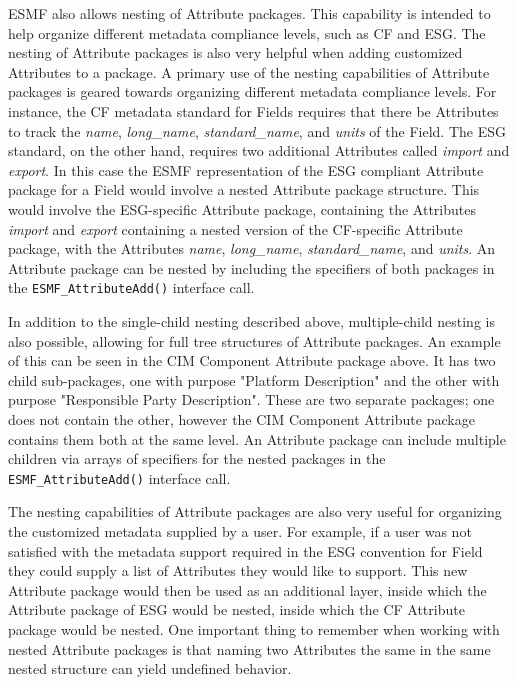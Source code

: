 \vspace{8pt}
ESMF also allows nesting of Attribute packages.  This capability is intended to help organize different metadata compliance levels, such as CF and ESG.  The nesting of Attribute packages is also very helpful when adding customized Attributes to a package.  A primary use of the nesting capabilities of Attribute packages is geared towards organizing different metadata compliance levels.  For instance, the CF metadata standard for Fields requires that there be Attributes to track the {\it name}, {\it long\_name}, {\it standard\_name}, and {\it units} of the Field.  The ESG standard, on the other hand, requires two additional Attributes called {\it import} and {\it export}.  In this case the ESMF representation of the ESG compliant Attribute package for a Field would involve a nested Attribute package structure.  This would involve the ESG-specific Attribute package, containing the Attributes {\it import} and {\it export} containing a nested version of the CF-specific Attribute package, with the Attributes {\it name}, {\it long\_name}, {\it standard\_name}, and {\it units}.  An Attribute package can be nested by including the specifiers of both packages in the {\tt ESMF\_AttributeAdd()} interface call.  

In addition to the single-child nesting described above, multiple-child nesting is also possible, allowing for full tree structures of Attribute packages.  An example of this can be seen in the CIM Component Attribute package above.  It has two child sub-packages, one with purpose "Platform Description" and the other with purpose "Responsible Party Description".  These are two separate packages; one does not contain the other, however the CIM Component Attribute package contains them both at the same level.  An Attribute package can include multiple children via arrays of specifiers for the nested packages in the {\tt ESMF\_AttributeAdd()} interface call.

The nesting capabilities of Attribute packages are also very useful for organizing the customized metadata supplied by a user.  For example, if a user was not satisfied with the metadata support required in the ESG convention for Field they could supply a list of Attributes they would like to support.  This new Attribute package would then be used as an additional layer, inside which the Attribute package of ESG would be nested, inside which the CF Attribute package would be nested.  One important thing to remember when working with nested Attribute packages is that naming two Attributes the same in the same nested structure can yield undefined behavior.

